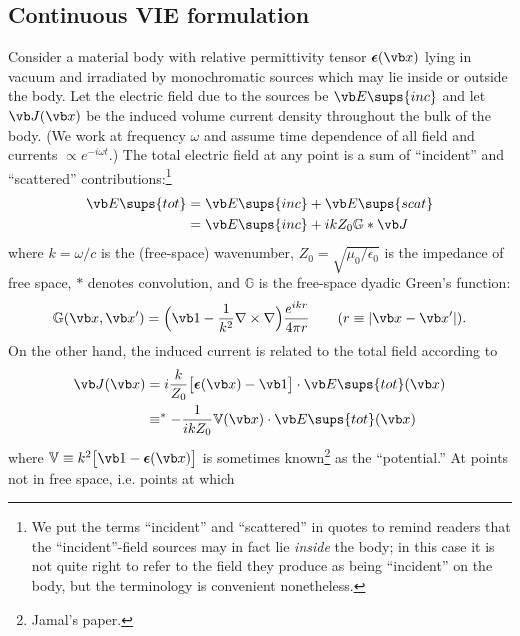 \documentclass[letterpaper]{article}
\newcommand{\vbeps}{\boldsymbol{\epsilon}}
\begin{document}
\subsection*{Continuous VIE formulation}

Consider a material body with relative permittivity tensor
$\vbeps(\vb x)$ lying in vacuum and irradiated by monochromatic
sources which may lie inside or outside the body. 
Let the electric field due to the sources be $\vb E\sups{inc}$ 
and let $\vb J(\vb x)$ be the induced volume current
density throughout the bulk of the body. 
(We work at frequency $\omega$ and assume time dependence
of all field and currents $\propto e^{-i\omega t}$.)
The total electric field at any point is a sum of
``incident'' and ``scattered'' contributions:\footnote{We
put the terms ``incident'' and ``scattered'' in quotes
to remind readers that the ``incident''-field sources may
in fact lie \textit{inside} the body; in this case it is 
not quite right to refer to the field they produce as 
being ``incident'' on the body, but the terminology is 
convenient nonetheless.}
\begin{align}
 \vb E\sups{tot} &= \vb E\sups{inc} + \vb E\sups{scat}
\\
                 &= \vb E\sups{inc} + ikZ_0 \mathbb{G}*\vb J
\label{ETot}
\end{align}
where $k=\omega/c$ is the (free-space) wavenumber,
$Z_0=\sqrt{\mu_0/\epsilon_0}$ is the impedance of free space,
$*$ denotes convolution, and $\mathbb{G}$ is the free-space
dyadic Green's function:
$$ \mathbb{G}(\vb x, \vb x^\prime) = 
   \Big(\vb 1 - \frac{1}{k^2} \nabla \times \nabla \Big)
   \frac{e^{ikr}}{4\pi r}
   \qquad (r\equiv |\vb x-\vb x^\prime|).
$$
On the other hand, the induced current is related to the total field
according to
\begin{align*}
 \vb J(\vb x) 
&= i\frac{k}{Z_0} \big[\vbeps(\vb x) - \vb 1\big]\cdot \vb E\sups{tot}(\vb x)
\\
&\equiv^* -\frac{1}{ikZ_0} \mathbb{V}(\vb x) \cdot \vb E\sups{tot}(\vb x)
\end{align*}
where $\mathbb{V}\equiv k^2\big[\vb 1 - \vbeps(\vb x)\big]$ is
sometimes known\footnote{Jamal's paper.} as the ``potential.''
At points not in free space, i.e. points at which 
\end{document}
